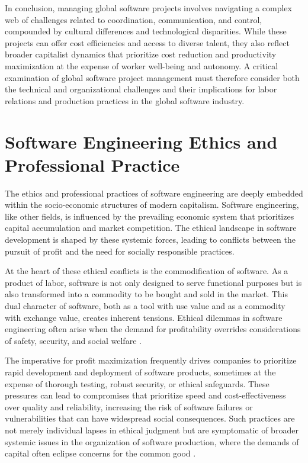 \begin{refsection}
In conclusion, managing global software projects involves navigating a complex web of challenges related to coordination, communication, and control, compounded by cultural differences and technological disparities. While these projects can offer cost efficiencies and access to diverse talent, they also reflect broader capitalist dynamics that prioritize cost reduction and productivity maximization at the expense of worker well-being and autonomy. A critical examination of global software project management must therefore consider both the technical and organizational challenges and their implications for labor relations and production practices in the global software industry.

\section{Software Engineering Ethics and Professional Practice}

The ethics and professional practices of software engineering are deeply embedded within the socio-economic structures of modern capitalism. Software engineering, like other fields, is influenced by the prevailing economic system that prioritizes capital accumulation and market competition. The ethical landscape in software development is shaped by these systemic forces, leading to conflicts between the pursuit of profit and the need for socially responsible practices.

At the heart of these ethical conflicts is the commodification of software. As a product of labor, software is not only designed to serve functional purposes but is also transformed into a commodity to be bought and sold in the market. This dual character of software, both as a tool with use value and as a commodity with exchange value, creates inherent tensions. Ethical dilemmas in software engineering often arise when the demand for profitability overrides considerations of safety, security, and social welfare \cite[pp.~12-15]{fuchs2014digital}.

The imperative for profit maximization frequently drives companies to prioritize rapid development and deployment of software products, sometimes at the expense of thorough testing, robust security, or ethical safeguards. These pressures can lead to compromises that prioritize speed and cost-effectiveness over quality and reliability, increasing the risk of software failures or vulnerabilities that can have widespread social consequences. Such practices are not merely individual lapses in ethical judgment but are symptomatic of broader systemic issues in the organization of software production, where the demands of capital often eclipse concerns for the common good \cite[pp.~45-47]{mosco2011political}.


\end{refsection}
